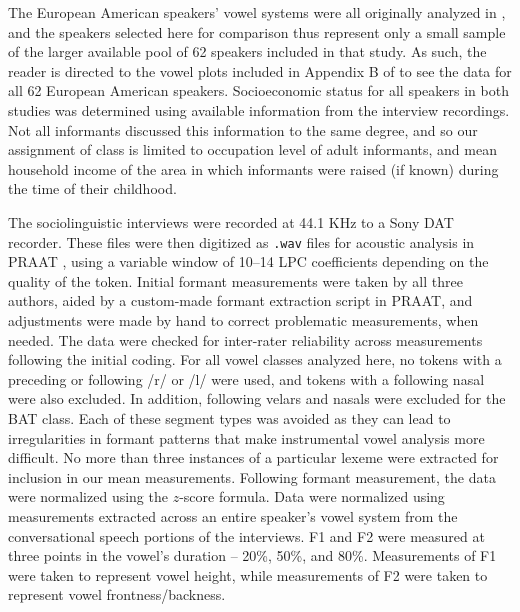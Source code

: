 \documentclass[output=paper,colorlinks,citecolor=brown]{langscibook}
\begin{document}
The European American speakers’ vowel systems were all originally analyzed in \citet{durian2012new}, and the speakers selected here for comparison thus represent only a small sample of the larger available pool of 62 speakers included in that study. As such, the reader is directed to the vowel plots included in Appendix B of \citet{durian2012new} to see the data for all 62 European American speakers. Socioeconomic status for all speakers in both studies was determined using available information from the interview recordings. Not all informants discussed this information to the same degree, and so our assignment of class is limited to  occupation level of adult informants,  and mean household income of the area in which informants were raised (if known) during the time of their childhood.

The sociolinguistic interviews were recorded at 44.1 KHz to a Sony DAT recorder. These files were then digitized as \texttt{.wav} files for acoustic analysis in PRAAT \citep{BoersmaWeenink2020}, using a variable window of 10--14 LPC coefficients depending on the quality of the token. Initial formant measurements were taken by all three authors, aided by a custom-made formant extraction script in PRAAT, and adjustments were made by hand to correct problematic measurements, when needed. The data were checked for inter-rater reliability across measurements following the initial coding. For all vowel classes analyzed here, no tokens with a preceding or following /r/ or /l/ were used, and tokens with a following nasal were also excluded. In addition, following velars and nasals were excluded for the BAT class.  Each of these segment types was avoided as they can lead to irregularities in formant patterns that make instrumental vowel analysis more difficult. No more than three instances of a particular lexeme were extracted for inclusion in our mean measurements. Following formant measurement, the data were normalized using the \citet{Lobanov1971} $z$-score formula. Data were normalized using measurements extracted across an entire speaker’s vowel system from the conversational speech portions of the interviews. F1 and F2 were measured at three points in the vowel’s duration -- 20\%, 50\%, and 80\%. Measurements of F1 were taken to represent vowel height, while measurements of F2 were taken to represent vowel frontness/backness.
\end{document}
